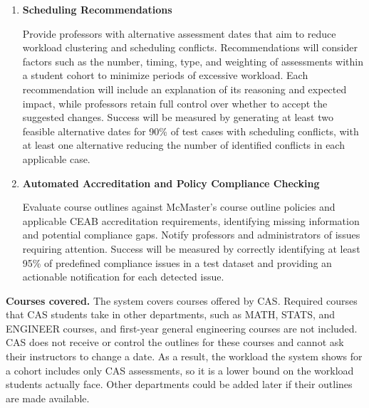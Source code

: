 \documentclass{article}
\begin{document}
\begin{enumerate}
    Identify weeks with high concentrations of assessments for students in the same academic year and program (undergraduate Software Engineering, Computer Science, or Mechatronics). Workload clustering will be evaluated based on assessment frequency, timing, type, and weighting. Scheduling conflicts will include multiple assessments scheduled on the same day for the same student cohort, assessments during restricted examination periods, and violations of relevant scheduling policies. Success will be measured by correctly identifying at least 90\% of predefined scheduling conflicts in a test dataset and associating all identified conflicts with the correct student cohort.

    \item \textbf{Scheduling Recommendations}
    
    Provide professors with alternative assessment dates that aim to reduce workload clustering and scheduling conflicts. Recommendations will consider factors such as the number, timing, type, and weighting of assessments within a student cohort to minimize periods of excessive workload. Each recommendation will include an explanation of its reasoning and expected impact, while professors retain full control over whether to accept the suggested changes. Success will be measured by generating at least two feasible alternative dates for 90\% of test cases with scheduling conflicts, with at least one alternative reducing the number of identified conflicts in each applicable case.

    \item \textbf{Automated Accreditation and Policy Compliance Checking}

    Evaluate course outlines against McMaster's course outline policies and applicable CEAB accreditation requirements, identifying missing information and potential compliance gaps. Notify professors and administrators of issues requiring attention. Success will be measured by correctly identifying at least 95\% of predefined compliance issues in a test dataset and providing an actionable notification for each detected issue.
\end{enumerate}

\noindent\textbf{Courses covered.} The system covers courses offered by CAS.
Required courses that CAS students take in other departments, such as MATH,
STATS, and ENGINEER courses, and first-year general engineering courses are not
included. CAS does not receive or control the outlines for these courses and
cannot ask their instructors to change a date. As a result, the workload the
system shows for a cohort includes only CAS assessments, so it is a lower bound
on the workload students actually face. Other departments could be added later
if their outlines are made available.
\end{document}
